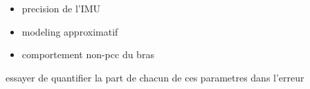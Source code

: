 \begin{itemize}
    \item precision de l'IMU
    \item modeling approximatif
    \item comportement non-pcc du bras
\end{itemize}
essayer de quantifier la part de chacun de ces parametres dans l'erreur 